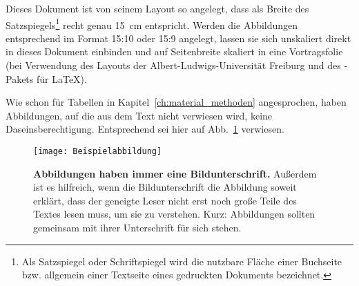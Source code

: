 Dieses Dokument ist von seinem Layout so angelegt, dass als Breite des Satzspiegels\footnote{Als Satzspiegel oder Schriftspiegel wird die nutzbare Fläche einer Buchseite bzw. allgemein einer Textseite eines gedruckten Dokuments bezeichnet.} recht genau 15~cm entspricht. Werden die Abbildungen entsprechend im Format 15:10 oder 15:9 angelegt, lassen sie sich unskaliert direkt in dieses Dokument einbinden und auf Seitenbreite skaliert in eine Vortragsfolie (bei Verwendung des Layouts der Albert-Ludwigs-Universität Freiburg und des -Pakets für \LaTeX{}).

Wie schon für Tabellen in Kapitel~\ref{ch:material_methoden} angesprochen, haben Abbildungen, auf die aus dem Text nicht verwiesen wird, keine Daseinsberechtigung. Entsprechend sei hier auf Abb.~\ref{fig:beispiel} verwiesen.

\begin{figure}[t]
\texttt{[image: Beispielabbildung]}
\caption[Abbildungen haben immer eine Bildunterschrift.]{\textbf{Abbildungen haben immer eine Bildunterschrift.} Außerdem ist es hilfreich, wenn die Bildunterschrift die Abbildung soweit erklärt, dass der geneigte Leser nicht erst noch große Teile des Textes lesen muss, um sie zu verstehen. Kurz: Abbildungen sollten gemeinsam mit ihrer Unterschrift für sich stehen.}
\label{fig:beispiel}
\end{figure}
